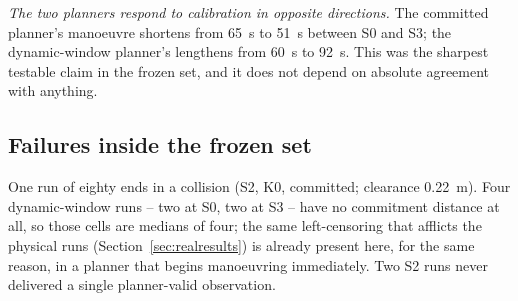 \emph{The two planners respond to calibration in opposite directions.}
The committed planner's manoeuvre shortens from \SI{65}{\second} to
\SI{51}{\second} between S0 and S3; the dynamic-window planner's
lengthens from \SI{60}{\second} to \SI{92}{\second}. This was the
sharpest testable claim in the frozen set, and it does not depend on
absolute agreement with anything.

\begin{table}[t]
\centering
\caption{Frozen simulated campaign \frozenmark, median of five
repetitions, for the three quantities the text uses. \emph{clearance}:
minimum obstacle clearance (\si{\metre}); \emph{span}: manoeuvre span
(\si{\second}); \emph{qualified}: range at the first qualified
observation (\si{\metre}). Lateral excursion and commitment distance are
in the accompanying repository; the dynamic-window commitment distance
equals the starting distance at every level, so it is a left-censored
bound rather than a measurement.}
\label{tab:frozen}
\setlength{\tabcolsep}{5pt}
\end{table}

\subsection{Failures inside the frozen set}

One run of eighty ends in a collision (S2, \textsf{K0}, committed;
clearance \SI{0.22}{\metre}). Four dynamic-window runs -- two at S0, two
at S3 -- have no commitment distance at all, so those cells are medians
of four; the same left-censoring that afflicts the physical runs
(Section~\ref{sec:realresults}) is already present here, for the same
reason, in a planner that begins manoeuvring immediately. Two S2 runs
never delivered a single planner-valid observation.

